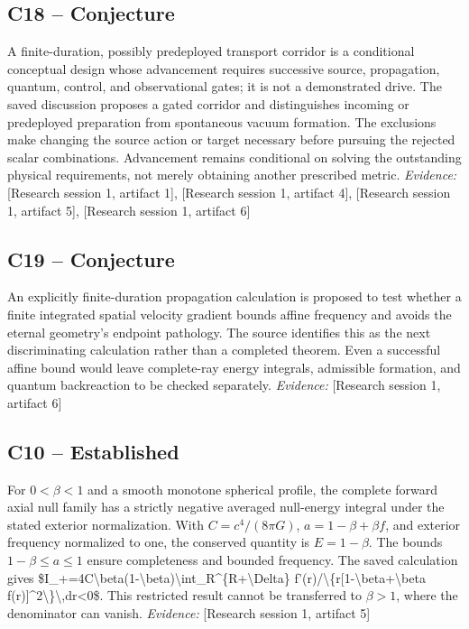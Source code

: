 \documentclass[11pt]{article}
\begin{document}
\begin{sloppypar}
\subsection{C18 -- Conjecture}
A finite-duration, possibly predeployed transport corridor is a conditional conceptual design whose advancement requires successive source, propagation, quantum, control, and observational gates; it is not a demonstrated drive.
The saved discussion proposes a gated corridor and distinguishes incoming or predeployed preparation from spontaneous vacuum formation. The exclusions make changing the source action or target necessary before pursuing the rejected scalar combinations. Advancement remains conditional on solving the outstanding physical requirements, not merely obtaining another prescribed metric.
\textit{Evidence: }[Research session 1, artifact 1], [Research session 1, artifact 4], [Research session 1, artifact 5], [Research session 1, artifact 6]
\subsection{C19 -- Conjecture}
An explicitly finite-duration propagation calculation is proposed to test whether a finite integrated spatial velocity gradient bounds affine frequency and avoids the eternal geometry's endpoint pathology.
The source identifies this as the next discriminating calculation rather than a completed theorem. Even a successful affine bound would leave complete-ray energy integrals, admissible formation, and quantum backreaction to be checked separately.
\textit{Evidence: }[Research session 1, artifact 6]
\subsection{C10 -- Established}
For $0<\beta<1$ and a smooth monotone spherical profile, the complete forward axial null family has a strictly negative averaged null-energy integral under the stated exterior normalization.
With $C=c^4/(8\pi G)$, $a=1-\beta+\beta f$, and exterior frequency normalized to one, the conserved quantity is $E=1-\beta$. The bounds $1-\beta\leq a\leq1$ ensure completeness and bounded frequency. The saved calculation gives \$I\_+=4C\textbackslash{}beta(1-\textbackslash{}beta)\textbackslash{}int\_R\textasciicircum{}\{R+\textbackslash{}Delta\} f'(r)/\textbackslash{}\{r[1-\textbackslash{}beta+\textbackslash{}beta f(r)]\textasciicircum{}2\textbackslash{}\}\textbackslash{},dr\textless{}0\$. This restricted result cannot be transferred to $\beta>1$, where the denominator can vanish.
\textit{Evidence: }[Research session 1, artifact 5]

\end{sloppypar}
\end{document}
